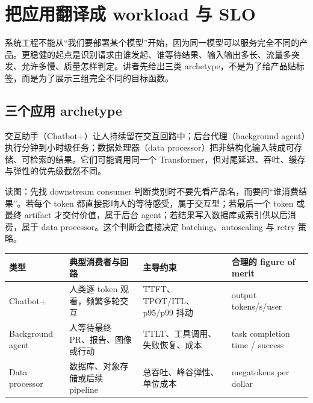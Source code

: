 \section{把应用翻译成 workload 与 SLO}

系统工程不能从“我们要部署某个模型”开始，因为同一模型可以服务完全不同的产品。更稳健的起点是识别请求由谁发起、谁等待结果、输入输出多长、流量多突发、允许多慢、质量怎样判定。讲者先给出三类 archetype，不是为了给产品贴标签，而是为了展示三组完全不同的目标函数。

\subsection{三个应用 archetype}

交互助手（Chatbot+）让人持续留在交互回路中；后台代理（background agent）执行分钟到小时级任务；数据处理器（data processor）把非结构化输入转成可存储、可检索的结果。它们可能调用同一个 Transformer，但对尾延迟、吞吐、缓存与弹性的优先级截然不同。


\begin{knowledgebox}{读图：先找 downstream consumer}
判断类别时不要先看产品名，而要问“谁消费结果”。若每个 token 都直接影响人的等待感受，属于交互型；若最后一个 token 或最终 artifact 才交付价值，属于后台 agent；若结果写入数据库或索引供以后消费，属于 data processor。这个判断会直接决定 batching、autoscaling 与 retry 策略。
\end{knowledgebox}

\begin{center}
\small
\begin{tabularx}{\textwidth}{L{2.5cm}YYY}
\toprule
类型 & 典型消费者与回路 & 主导约束 & 合理的 figure of merit \\
\midrule
Chatbot+ & 人类逐 token 观看，频繁多轮交互 & TTFT、TPOT/ITL、p95/p99 抖动 & output tokens/s/user \\
Background agent & 人等待最终 PR、报告、图像或行动 & TTLT、工具调用、失败恢复、成本 & task completion time / success \\
Data processor & 数据库、对象存储或后续 pipeline & 总吞吐、峰谷弹性、单位成本 & megatokens per dollar \\
\bottomrule
\end{tabularx}
\end{center}


